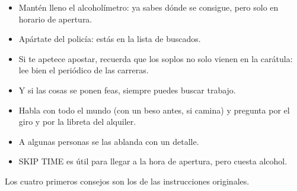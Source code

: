 
\begin{itemize}
\item Mant\'en lleno el alcohol\'imetro: ya sabes d\'onde se consigue, pero solo en horario de apertura.
\item Ap\'artate del polic\'ia: est\'as en la lista de buscados.
\item Si te apetece apostar, recuerda que los soplos no solo vienen en la car\'atula: lee bien el peri\'odico de las carreras.
\item Y si las cosas se ponen feas, siempre puedes buscar trabajo.
\item Habla con todo el mundo (con un beso antes, si camina) y pregunta por el giro y por la libreta del alquiler.
\item A algunas personas se las ablanda con un detalle.
\item SKIP TIME es \'util para llegar a la hora de apertura, pero cuesta alcohol.
\end{itemize}

{\small Los cuatro primeros consejos son los de las instrucciones originales.}
